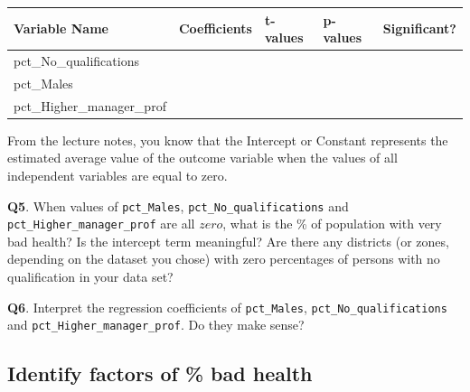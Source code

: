 \documentclass[
  letterpaper,
  DIV=11,
  numbers=noendperiod]{scrreprt}
\begin{document}
\begin{longtable}[]{@{}
  >{\raggedright\arraybackslash}p{}
  >{\raggedright\arraybackslash}p{}
  >{\raggedright\arraybackslash}p{}
  >{\raggedright\arraybackslash}p{}
  >{\raggedright\arraybackslash}p{}@{}}
\toprule\noalign{}
\begin{minipage}[b]{\linewidth}\raggedright
Variable Name
\end{minipage} & \begin{minipage}[b]{\linewidth}\raggedright
Coefficients
\end{minipage} & \begin{minipage}[b]{\linewidth}\raggedright
t-values
\end{minipage} & \begin{minipage}[b]{\linewidth}\raggedright
p-values
\end{minipage} & \begin{minipage}[b]{\linewidth}\raggedright
Significant?
\end{minipage} \\
\midrule\noalign{}
\endhead
\bottomrule\noalign{}
\endlastfoot
pct\_No\_qualifications & & & & \\
pct\_Males & & & & \\
pct\_Higher\_manager\_prof & & & & \\
\end{longtable}

From the lecture notes, you know that the Intercept or Constant
represents the estimated average value of the outcome variable when the
values of all independent variables are equal to zero.

\textbf{Q5}. When values of \texttt{pct\_Males},
\texttt{pct\_No\_qualifications} and \texttt{pct\_Higher\_manager\_prof}
are all \(zero\), what is the \% of population with very bad health? Is
the intercept term meaningful? Are there any districts (or zones,
depending on the dataset you chose) with zero percentages of persons
with no qualification in your data set?

\textbf{Q6}. Interpret the regression coefficients of
\texttt{pct\_Males}, \texttt{pct\_No\_qualifications} and
\texttt{pct\_Higher\_manager\_prof}. Do they make sense?

\subsection{Identify factors of \% bad
health}\label{identify-factors-of-bad-health}
\end{document}
